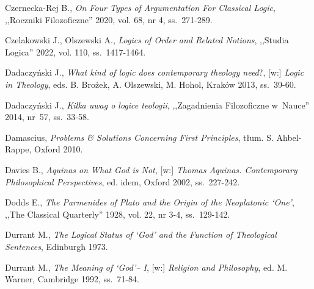 \begin{thebibliography}{100}
Czernecka-Rej B., \textit{On Four Types of Argumentation For Classical Logic}, ,,Roczniki Filozoficzne'' 2020, vol. 68, nr 4, ss.~271-289.

Czelakowski J., Olszewski A., \textit{Logics of Order and Related Notions}, ,,Studia Logica'' 2022, vol. 110, ss.~1417-1464.

Dadaczyński J., \textit{What kind of logic does contemporary theology need}?, [w:] \textit{Logic in Theology}, eds. B. Brożek, A. Olszewski, M. Hohol, Kraków 2013, ss.~39-60.

Dadaczyński J., \textit{Kilka uwag o logice teologii}, ,,Zagadnienia Filozoficzne w~Nauce'' 2014, nr~57, ss.~33-58.

Damascius, \textit{Problems \& Solutions Concerning First Principles}, tłum. S. Ahbel-Rappe, Oxford 2010.

Davies B., \textit{Aquinas on What God is Not}, [w:]  \textit{Thomas Aquinas. Contemporary Philosophical Perspectives}, ed. idem, Oxford 2002, ss.~227-242.


Dodds E., \textit{The Parmenides of Plato and the Origin of the Neoplatonic ‘One'}, ,,The Classical Quarterly'' 1928, vol. 22, nr 3-4, ss.~129-142.



Durrant M., \textit{The Logical Status of ‘God' and the Function of Theological Sentences}, Edinburgh 1973.

Durrant M., \textit{The Meaning of ‘God'– I}, [w:] \textit{Religion and Philosophy}, ed. M. Warner, Cambridge 1992, ss.~71-84.


\end{thebibliography}
